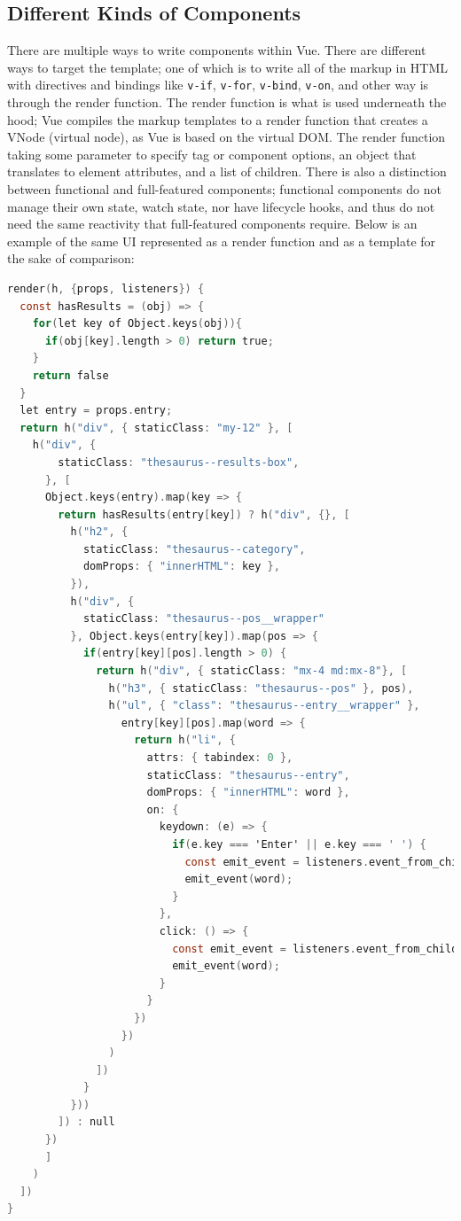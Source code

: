 \documentclass[11pt, twoside, reqno]{book}
\begin{document}
\subsection{Different Kinds of Components}

There are multiple ways to write components within Vue. There are different ways to target the template; one of which is to write all of the markup in HTML with directives and bindings like \texttt{v-if}, \texttt{v-for}, \texttt{v-bind}, \texttt{v-on}, and other way is through the render function. The render function is what is used underneath the hood; Vue compiles the markup templates to a render function that creates a VNode (virtual node), as Vue is based on the virtual DOM. The render function taking some parameter to specify tag or component options, an object that translates to element attributes, and a list of children. There is also a distinction between functional and full-featured components; functional components do not manage their own state, watch state, nor have lifecycle hooks, and thus do not need the same reactivity that full-featured components require. Below is an example of the same UI represented as a render function and as a template for the sake of comparison:
\begin{lstlisting}[language=C]
render(h, {props, listeners}) {
  const hasResults = (obj) => {
    for(let key of Object.keys(obj)){
      if(obj[key].length > 0) return true;
    }
    return false
  }
  let entry = props.entry;
  return h("div", { staticClass: "my-12" }, [
    h("div", {
        staticClass: "thesaurus--results-box",
      }, [
      Object.keys(entry).map(key => {
        return hasResults(entry[key]) ? h("div", {}, [
          h("h2", {
            staticClass: "thesaurus--category",
            domProps: { "innerHTML": key },
          }),
          h("div", {
            staticClass: "thesaurus--pos__wrapper"
          }, Object.keys(entry[key]).map(pos => {
            if(entry[key][pos].length > 0) {
              return h("div", { staticClass: "mx-4 md:mx-8"}, [
                h("h3", { staticClass: "thesaurus--pos" }, pos),
                h("ul", { "class": "thesaurus--entry__wrapper" }, 
                  entry[key][pos].map(word => {
                    return h("li", {
                      attrs: { tabindex: 0 },
                      staticClass: "thesaurus--entry",
                      domProps: { "innerHTML": word },
                      on: {
                        keydown: (e) => {
                          if(e.key === 'Enter' || e.key === ' ') {
                            const emit_event = listeners.event_from_child;
                            emit_event(word);
                          }
                        },
                        click: () => {
                          const emit_event = listeners.event_from_child;
                          emit_event(word);
                        }
                      }
                    })
                  })
                )
              ])
            }
          }))
        ]) : null
      })
      ] 
    )
  ])
}
\end{lstlisting}
\end{document}
